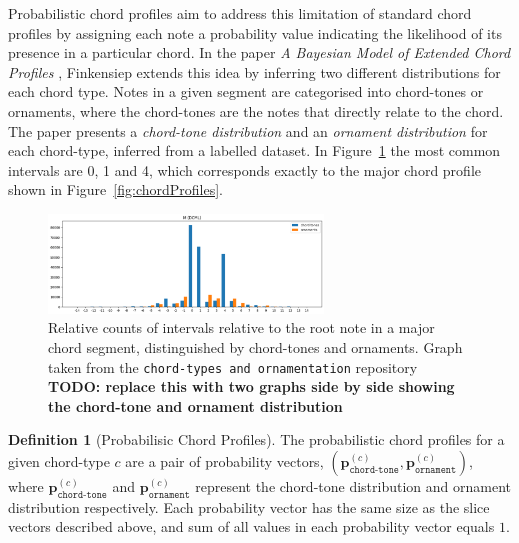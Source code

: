 \documentclass[12pt,a4paper,twoside,openany]{report} \usepackage[pdfborder={0 0 0}]{hyperref}    %
\theoremstyle{definition} \newtheorem{definition}{Definition}[section]
\begin{document}
Probabilistic chord profiles aim to address this limitation of standard chord profiles by assigning each note
a probability value indicating the likelihood of its presence in a particular chord. In the paper \textit{A Bayesian Model
of Extended Chord Profiles} \cite{finkensiepChordTypesOrnamentation2023}, Finkensiep extends this idea by inferring two different distributions for each chord type. Notes in a given segment are categorised into chord-tones or ornaments, where the
chord-tones are the notes that directly relate to the chord. The paper presents a \textit{chord-tone distribution} and an
\textit{ornament distribution} for each chord-type, inferred from a labelled dataset. In Figure~\ref{fig:probChordProfile} the most common intervals are 0, 1 and 4, which corresponds exactly to the major chord profile shown in Figure~\ref{fig:chordProfiles}. 

\begin{figure}[ht]
  \begin{center}
    \includegraphics[width=0.65\textwidth]{figs/prep/inferringHarmony/probChordProfile.png}
  \end{center}
  \caption{Relative counts of intervals relative to the root note in a major chord segment, distinguished by chord-tones
  and ornaments. Graph taken from the \texttt{chord-types and ornamentation} repository
\cite{finkensiepChordTypesOrnamentation2023} \textbf{\footnotesize TODO: replace this with two graphs side by side showing the
chord-tone and ornament distribution}}
  \label{fig:probChordProfile}
\end{figure}

\begin{definition}[Probabilisic Chord Profiles] 
  The probabilistic chord profiles for a given chord-type $c$ are a pair of probability vectors,
  $(\mathbf{p}^{(c)}_{\texttt{chord-tone}}, \mathbf{p}^{(c)}_{\texttt{ornament}})$, where $\mathbf{p}^{(c)}_{\texttt{chord-tone}}$ and
  $\mathbf{p}^{(c)}_{\texttt{ornament}}$ represent the chord-tone distribution and ornament distribution respectively. Each
  probability vector has the same size as the slice vectors described above, and sum of all values in each probability vector equals $1$.
\end{definition}
\end{document}
